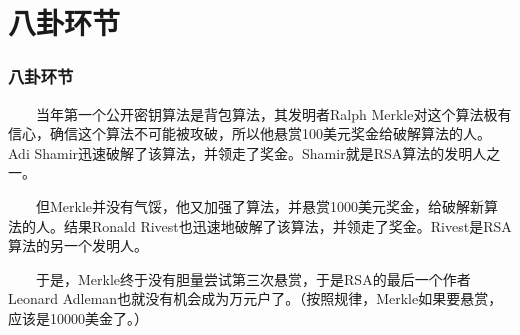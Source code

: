\documentclass[slidestop,compress,mathserif]{beamer}
\begin{document}
\section{八卦环节}
\begin{frame}
  \transblindsvertical
  \frametitle{八卦环节}
 ~~~~当年第一个公开密钥算法是背包算法，其发明者Ralph Merkle对这个算法极有信心，确信这个算法不可能被攻破，所以他悬赏100美元奖金给破解算法的人。Adi Shamir迅速破解了该算法，并领走了奖金。Shamir就是RSA算法的发明人之一。

 ~~~~但Merkle并没有气馁，他又加强了算法，并悬赏1000美元奖金，给破解新算法的人。结果Ronald Rivest也迅速地破解了该算法，并领走了奖金。Rivest是RSA算法的另一个发明人。

 ~~~~于是，Merkle终于没有胆量尝试第三次悬赏，于是RSA的最后一个作者Leonard Adleman也就没有机会成为万元户了。（按照规律，Merkle如果要悬赏，应该是10000美金了。）
\end{frame}








%
\end{document}
